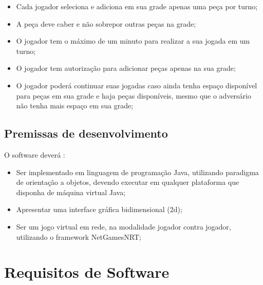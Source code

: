 \documentclass[
	12pt,	
	openany,			
	oneside,			
	a4paper,			
	english,			
	french,			
	spanish,			
	brazil,	
	]{abntex2}
\begin{document}
\begin{itemize}
\item Cada jogador seleciona e adiciona em sua grade apenas uma peça por turno;
\item A peça deve caber e não sobrepor outras peças na grade;
\item O jogador tem o máximo de um minuto para realizar a sua jogada em um turno;
\item O jogador tem autorização para adicionar peças apenas na sua grade;
\item O jogador poderá continuar suas jogadas caso ainda tenha espaço disponível para peças em sua grade e haja peças disponíveis, mesmo que o adversário não tenha mais espaço em sua grade;
\end{itemize}

\section{Premissas de desenvolvimento}

O software deverá :

\begin{itemize}
\item Ser implementado em linguagem de programação Java, utilizando paradigma de orientação a objetos, devendo executar em qualquer plataforma que disponha de máquina virtual Java;
\item Apresentar uma interface gráfica bidimensional (2d);
\item Ser um jogo virtual em rede, na modalidade jogador contra jogador, utilizando o framework NetGamesNRT;
\end{itemize}

\chapter{Requisitos de Software}
\end{document}
